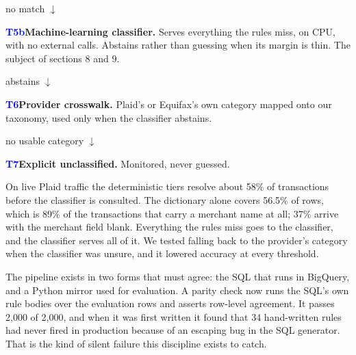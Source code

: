 {\small\color{Muted} no match $\downarrow$\par}
\begin{tcolorbox}[colback=BlueTint,colframe=BlueTint,arc=2mm]
\textcolor{Blue}{\textbf{T5b}}\quad \textbf{Machine-learning classifier.} Serves everything the rules miss, on CPU, with no external calls. Abstains rather than guessing when its margin is thin. The subject of sections 8 and 9.
\end{tcolorbox}
{\small\color{Muted} abstains $\downarrow$\par}
\begin{tcolorbox}[colback=BlueTint,colframe=BlueTint,arc=2mm]
\textcolor{Blue}{\textbf{T6}}\quad \textbf{Provider crosswalk.} Plaid's or Equifax's own category mapped onto our taxonomy, used only when the classifier abstains.
\end{tcolorbox}
{\small\color{Muted} no usable category $\downarrow$\par}
\begin{tcolorbox}[colback=BlueTint,colframe=BlueTint,arc=2mm]
\textcolor{Blue}{\textbf{T7}}\quad \textbf{Explicit unclassified.} Monitored, never guessed.
\end{tcolorbox}
On live Plaid traffic the deterministic tiers resolve about 58\% of transactions before the classifier is consulted. The dictionary alone covers 56.5\% of rows, which is 89\% of the transactions that carry a merchant name at all; 37\% arrive with the merchant field blank. Everything the rules miss goes to the classifier, and the classifier serves all of it. We tested falling back to the provider's category when the classifier was unsure, and it lowered accuracy at every threshold.

The pipeline exists in two forms that must agree: the SQL that runs in BigQuery, and a Python mirror used for evaluation. A parity check now runs the SQL's own rule bodies over the evaluation rows and asserts row-level agreement. It passes 2,000 of 2,000, and when it was first written it found that 34 hand-written rules had never fired in production because of an escaping bug in the SQL generator. That is the kind of silent failure this discipline exists to catch.


